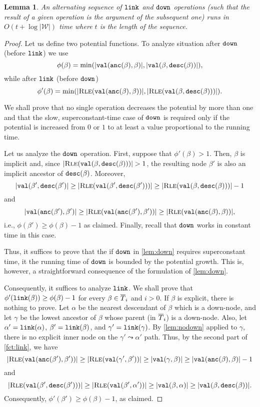 \documentclass[a4paper]{article}
\newtheorem{lemma}[theorem]{Lemma}
\theoremstyle{remark}
\newcommand{\rle}{\textsc{Rle}}
\newcommand{\coll}{\mathcal{W}}
\begin{document}
\begin{lemma}\label{lem:amort}
An alternating sequence of $\mathtt{link}$ and $\mathtt{down}$ operations (such that the result of a given operation
is the argument of the subsequent one) runs in $O(t+\log|\coll|)$ time where $t$ is the length of the sequence.
\end{lemma}
\begin{proof}
Let us define two potential functions.
To analyze situation after $\mathtt{down}$ (before $\mathtt{link}$) we use
 $$\phi(\beta)=\min(|\mathtt{val}(\mathtt{anc}(\beta),\beta)|,|\mathtt{val}(\beta,\mathtt{desc}(\beta))|),$$
 while after $\mathtt{link}$ (before $\mathtt{down}$)
 $$\phi'(\beta)=\min(|\rle(\tval(\tanc(\beta),\beta))|,|\rle(\tval(\beta,\tdesc(\beta)))|).$$

We shall prove that no single operation decreases the potential by more than one
and that the slow, superconstant-time case of $\mathtt{down}$ is required only if the potential is
increased from $0$ or $1$ to at least a value proportional to the running time.

Let us analyze the $\mathtt{down}$ operation. First, suppose that $\phi'(\beta)>1$.
Then, $\beta$ is implicit and, since $|\rle(\tval(\beta,\tdesc(\beta)))|>1$,
the resulting node $\beta'$ is also an implicit ancestor of $\mathtt{desc}(\beta)$.
Moreover,
$$|\tval(\beta',\tdesc(\beta')|\ge |\rle(\tval(\beta',\tdesc(\beta')))|\ge |\rle(\tval(\beta,\tdesc(\beta)))|-1$$
and
$$|\tval(\tanc(\beta'),\beta')|\ge |\rle(\tval(\tanc(\beta'),\beta'))|\ge |\rle(\tval(\tanc(\beta),\beta))|,$$
i.e., $\phi(\beta')\ge \phi(\beta)-1$ as claimed.
Finally, recall that $\mathtt{down}$ works in constant time in this case.

Thus, it suffices to prove that the if $\mathtt{down}$ in \cref{lem:down} requires superconstant time,
it the running time of $\mathtt{down}$ is bounded by the potential growth.
 This is, however, a straightforward consequence of the formulation of \cref{lem:down}.

 Consequently, it suffices to analyze $\mathtt{link}$. We shall prove that $\phi'(\mathtt{link}(\beta))\ge \phi(\beta)-1$ for every $\beta\in \overline{T}_i$ and $i>0$.
 If $\beta$ is explicit, there is nothing to prove.
 Let $\alpha$ be the nearest descendant of $\beta$ which is a down-node, and let $\gamma$ be the lowest ancestor of $\beta$
 whose parent (in $\overline{T}_i$) is a down-node. Also, let $\alpha'=\mathtt{link}(\alpha)$, $\beta'=\mathtt{link}(\beta)$, and $\gamma'=\mathtt{link}(\gamma)$.
 By \cref{lem:nodown} applied to $\gamma$, there is no explicit inner node on the $\gamma'\leadsto \alpha'$ path.
 Thus, by the second part of \cref{fct:link}, we have
 $$|\rle(\tval(\tanc(\beta'),\beta'))|\ge|\rle(\tval(\gamma',\beta'))|\ge |\tval(\gamma,\beta)|\ge |\tval(\tanc(\beta),\beta)|-1$$
 and
 $$|\rle(\tval(\beta',\tdesc(\beta')))|\ge |\rle(\tval(\beta',\alpha'))|\ge |\tval(\beta,\alpha)|\ge |\tval(\beta,\tdesc(\beta))|.$$
 Consequently, $\phi'(\beta')\ge \phi(\beta)-1$, as claimed.
\end{proof}
\end{document}
